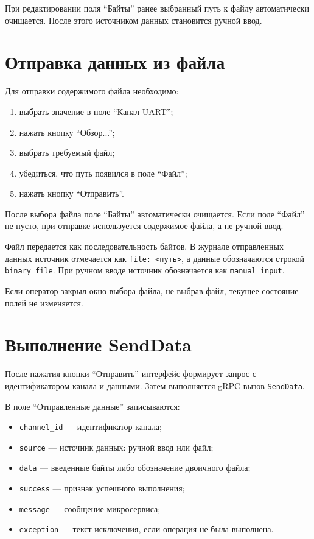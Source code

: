 При редактировании поля ``Байты'' ранее выбранный путь к файлу автоматически
очищается. После этого источником данных становится ручной ввод.

\section{Отправка данных из файла}

Для отправки содержимого файла необходимо:

\begin{enumerate}
	\item выбрать значение в поле ``Канал UART'';
	\item нажать кнопку ``Обзор...'';
	\item выбрать требуемый файл;
	\item убедиться, что путь появился в поле ``Файл'';
	\item нажать кнопку ``Отправить''.
\end{enumerate}

После выбора файла поле ``Байты'' автоматически очищается. Если поле ``Файл''
не пусто, при отправке используется содержимое файла, а не ручной ввод.

Файл передается как последовательность байтов. В журнале отправленных данных
источник отмечается как \texttt{file: <путь>}, а данные обозначаются строкой
\texttt{binary file}. При ручном вводе источник обозначается как
\texttt{manual input}.

Если оператор закрыл окно выбора файла, не выбрав файл, текущее состояние
полей не изменяется.

\section{Выполнение SendData}

После нажатия кнопки ``Отправить'' интерфейс формирует запрос с идентификатором
канала и данными. Затем выполняется gRPC-вызов \texttt{SendData}.

В поле ``Отправленные данные'' записываются:

\begin{itemize}
	\item \texttt{channel\_id} --- идентификатор канала;
	\item \texttt{source} --- источник данных: ручной ввод или файл;
	\item \texttt{data} --- введенные байты либо обозначение двоичного файла;
	\item \texttt{success} --- признак успешного выполнения;
	\item \texttt{message} --- сообщение микросервиса;
	\item \texttt{exception} --- текст исключения, если операция не была выполнена.
\end{itemize}


